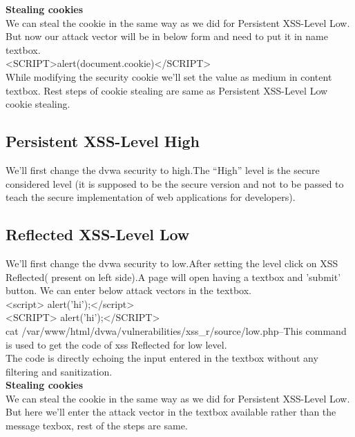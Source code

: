 \documentclass{article}
\begin{document}
\textbf{Stealing cookies}\\
We can steal the cookie in the same way as we did for Persistent XSS-Level Low. But now our attack vector will be in below form and need to put it in name textbox.\\
<SCRIPT>alert(document.cookie)</SCRIPT>\\
While modifying  the security cookie we'll set the value as medium in content textbox. Rest steps of cookie stealing are same as Persistent XSS-Level Low cookie stealing.
\subsection{Persistent XSS-Level High}
We'll first change the dvwa security to high.The “High” level is the secure considered level (it is supposed to be the secure version and not to be passed to teach the secure implementation of web applications for developers).

\subsection{Reflected XSS-Level Low}
We'll first change the dvwa security to low.After setting the level click on XSS Reflected( present on left side).A page will open having a textbox and 'submit' button. We can enter below attack vectors in the textbox.\\
<script> alert('hi');</script>\\
<SCRIPT> alert('hi');</SCRIPT>\\
cat /var/www/html/dvwa/vulnerabilities/xss\_r/source/low.php--This command is used to get the code of xss Reflected for low level.\\
The code is directly echoing the input entered in the textbox without any filtering and sanitization.\\
\textbf{Stealing cookies}\\
We can steal the cookie in the same way as we did for Persistent XSS-Level Low. But here we'll enter the attack vector in the textbox available rather than the message texbox, rest of the steps are same.
\end{document}

